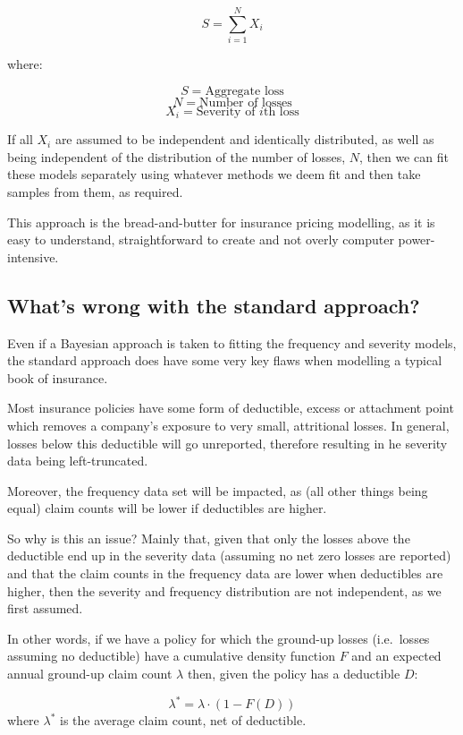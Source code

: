 \documentclass[
]{book}
\begin{document}
\[S = \sum_{i=1}^{N} X_i\]

where:

\[S = \mbox{Aggregate loss}\]
\[N = \mbox{Number of losses}\]
\[X_i = \mbox{Severity of } i \mbox{th loss}\]

If all \(X_i\) are assumed to be independent and identically distributed, as well as being independent of the distribution of the number of losses, \(N\), then we can fit these models separately using whatever methods we deem fit and then take samples from them, as required.

This approach is the bread-and-butter for insurance pricing modelling, as it is easy to understand, straightforward to create and not overly computer power-intensive.

\hypertarget{whats-wrong-with-the-standard-approach}{%
\subsection{What's wrong with the standard approach?}\label{whats-wrong-with-the-standard-approach}}

Even if a Bayesian approach is taken to fitting the frequency and severity models, the standard approach does have some very key flaws when modelling a typical book of insurance.

Most insurance policies have some form of deductible, excess or attachment point which removes a company's exposure to very small, attritional losses. In general, losses below this deductible will go unreported, therefore resulting in he severity data being left-truncated.

Moreover, the frequency data set will be impacted, as (all other things being equal) claim counts will be lower if deductibles are higher.

So why is this an issue? Mainly that, given that only the losses above the deductible end up in the severity data (assuming no net zero losses are reported) and that the claim counts in the frequency data are lower when deductibles are higher, then the severity and frequency distribution are not independent, as we first assumed.

In other words, if we have a policy for which the ground-up losses (i.e.~losses assuming no deductible) have a cumulative density function \(F\) and an expected annual ground-up claim count \(\lambda\) then, given the policy has a deductible \(D\):

\[\lambda^* = \lambda \cdot (1-F(D))\]
where \(\lambda^*\) is the average claim count, net of deductible.
\end{document}
